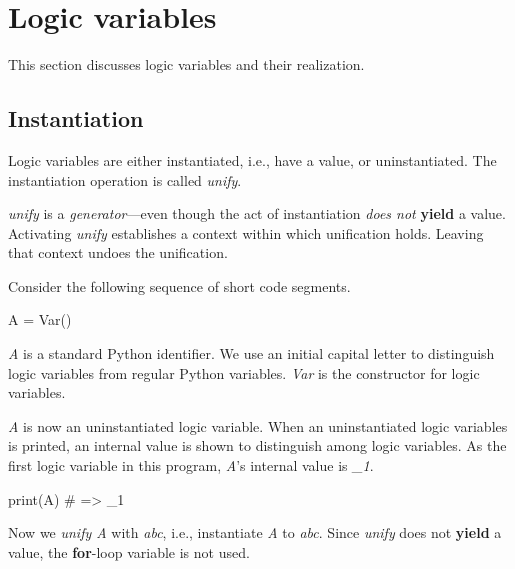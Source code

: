 
\section{Logic variables} \label{sec:logic-variables}
This section discusses logic variables and their realization. 

\subsection{Instantiation}
Logic variables are either instantiated, i.e., have a value, or uninstantiated. The instantiation operation is called \textit{unify}.   

\textit{unify} is a \textit{generator}---even though the act of instantiation \textit{does not} \textbf{yield} a value. Activating \textit{unify} establishes a context within which unification holds. Leaving that context undoes the unification. 

Consider the following sequence of short code segments. 
\begin{center}
\begin{minipage}[c]{0.45\textwidth}
\begin{python1}
A = Var()
\end{python1}
\end{minipage}
\end{center}
\textit{A} is a standard Python identifier. We use an initial capital letter to distinguish logic variables from regular Python variables. \textit{Var} is the constructor for logic variables.

\textit{A} is now an uninstantiated logic variable. When an uninstantiated logic variables is printed, an internal value is shown to distinguish among logic variables. As the first logic variable in this program, \textit{A}'s internal value is \textit{\_1}.

\begin{center}
\begin{minipage}[c]{0.45\textwidth}
\begin{python1}
print(A)  # => _1
\end{python1}
\end{minipage}
\end{center}

Now we \textit{unify A} with \textit{abc}, i.e., instantiate \textit{A} to \textit{abc}. Since \textit{unify} does not \textbf{yield} a value, the \textbf{for}-loop variable is not used. 

